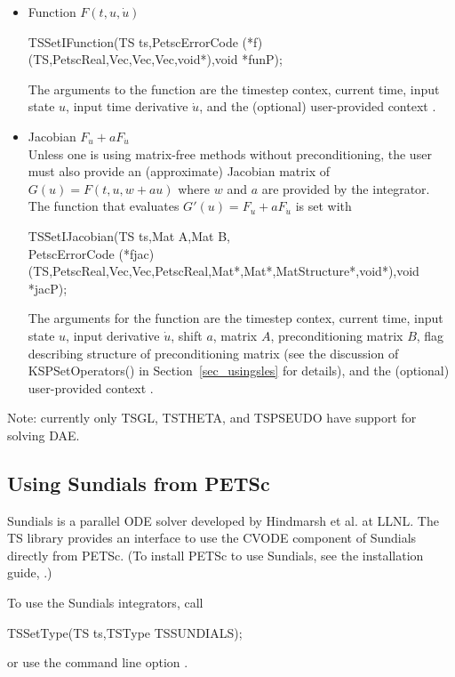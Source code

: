 \begin{itemize}
\item Function $F(t,u,\dot{u})$
  \begin{tabbing}
    TSSetIFunction(TS ts,PetscErrorCode (*f)(TS,PetscReal,Vec,Vec,Vec,void*),void *funP);
  \end{tabbing}
  The arguments to the function  are the
  timestep contex, current time, input state $u$, input time derivative
  $\dot{u}$, and the (optional) user-provided context .

\item Jacobian $F_u + aF_{\dot{u}}$ \\
  Unless one is using matrix-free methods without preconditioning, the
  user must also provide an (approximate) Jacobian matrix of $G(u) =
  F(t,u,w+au)$ where $w$ and $a$ are provided by the integrator.  The
  function that evaluates $G'(u) = F_u + aF_{\dot{u}}$ is set with
  \begin{tabbing}
    TS\=SetIJacobian(TS ts,Mat A,Mat B,\\
    \>PetscErrorCode (*fjac)(TS,PetscReal,Vec,Vec,PetscReal,Mat*,Mat*,MatStructure*,void*),void *jacP);
  \end{tabbing}
  The arguments for the function 
  are the timestep contex, current time, input state $u$, input
  derivative $\dot{u}$, shift $a$, matrix $A$, preconditioning matrix
  $B$, flag describing structure of preconditioning matrix (see the
  discussion of KSPSetOperators() in Section~\ref{sec_usingsles} for
  details), and the (optional) user-provided context .
\end{itemize}

Note: currently only TSGL, TSTHETA, and TSPSEUDO have
support for solving DAE.

\subsection{Using Sundials from PETSc}
\label{sec_sundials}

Sundials is a parallel ODE solver developed by Hindmarsh et al. at LLNL.
The TS library provides an interface to use the CVODE component of
Sundials directly from PETSc.  (To install PETSc to use Sundials, see
the installation guide, .)

To use the Sundials integrators, call
\begin{tabbing}
 TSSetType(TS ts,TSType TSSUNDIALS);
\end{tabbing}
or use the command line option  . 
  


